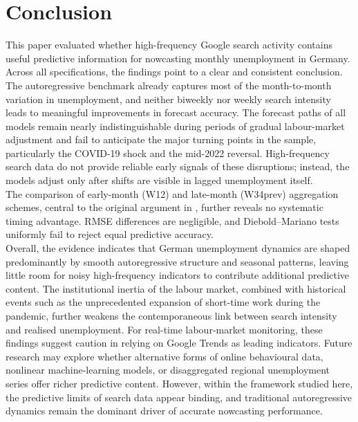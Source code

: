 \documentclass[12pt,a4paper]{article}
\begin{document}
\section{Conclusion}
This paper evaluated whether high-frequency Google search activity contains
useful predictive information for nowcasting monthly unemployment in Germany.
Across all specifications, the findings point to a clear and consistent
conclusion. The autoregressive benchmark already captures most of the
month-to-month variation in unemployment, and neither biweekly nor weekly search
intensity leads to meaningful improvements in forecast accuracy. The forecast paths of all models remain nearly indistinguishable during
periods of gradual labour-market adjustment and fail to anticipate the major
turning points in the sample, particularly the COVID-19 shock and the mid-2022
reversal. High-frequency search data do not provide reliable early signals of
these disruptions; instead, the models adjust only after shifts are visible in
lagged unemployment itself.\\
The comparison of early-month (W12) and late-month (W34prev) aggregation
schemes, central to the original argument in \citet{Askitas}, further reveals no
systematic timing advantage. RMSE differences are negligible, and Diebold–Mariano
tests uniformly fail to reject equal predictive accuracy.\\
Overall, the evidence indicates that German unemployment dynamics are shaped
predominantly by smooth autoregressive structure and seasonal patterns, leaving
little room for noisy high-frequency indicators to contribute additional
predictive content. The institutional inertia of the labour market, combined with
historical events such as the unprecedented expansion of short-time work during
the pandemic, further weakens the contemporaneous link between search intensity
and realised unemployment. For real-time labour-market monitoring, these findings
suggest caution in relying on Google Trends as leading indicators.
Future research may explore whether alternative forms of online behavioural data,
nonlinear machine-learning models, or disaggregated regional unemployment series
offer richer predictive content. However, within the framework studied here, the
predictive limits of search data appear binding, and traditional autoregressive
dynamics remain the dominant driver of accurate nowcasting performance.






\newpage
\end{document}

